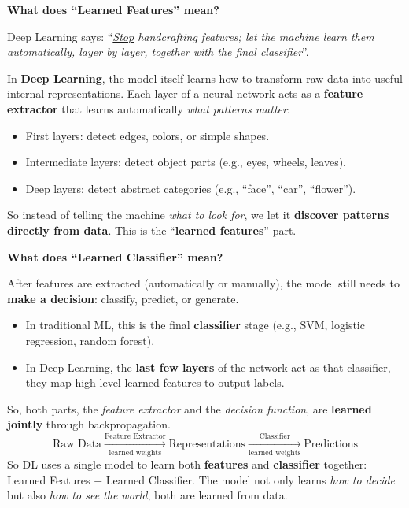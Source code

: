 \highspace
\begin{flushleft}
    \textcolor{Green3}{ \textbf{What does ``Learned Features'' mean?}}
\end{flushleft}
Deep Learning says: ``\emph{\underline{Stop} handcrafting features; let the machine learn them automatically, layer by layer, together with the final classifier}''.

\highspace
In \textbf{Deep Learning}, the model itself learns how to transform raw data into useful internal representations. Each layer of a neural network acts as a \textbf{feature extractor} that learns automatically \emph{what patterns matter}:
\begin{itemize}
    \item First layers: detect edges, colors, or simple shapes.
    \item Intermediate layers: detect object parts (e.g., eyes, wheels, leaves).
    \item Deep layers: detect abstract categories (e.g., ``face'', ``car'', ``flower'').
\end{itemize}
So instead of telling the machine \emph{what to look for}, we let it \textbf{discover patterns directly from data}. This is the ``\textbf{learned features}'' part.

\highspace
\begin{flushleft}
    \textcolor{Green3}{ \textbf{What does ``Learned Classifier'' mean?}}
\end{flushleft}
After features are extracted (automatically or manually), the model still needs to \textbf{make a decision}: classify, predict, or generate.
\begin{itemize}
    \item In traditional ML, this is the final \textbf{classifier} stage (e.g., SVM, logistic regression, random forest).
    \item In Deep Learning, the \textbf{last few layers} of the network act as that classifier, they map high-level learned features to output labels.
\end{itemize}
So, both parts, the \emph{feature extractor} and the \emph{decision function}, are \textbf{learned jointly} through backpropagation.
\begin{equation*}
    \text{Raw Data} \xrightarrow[\text{learned weights}]{\text{Feature Extractor}} \text{Representations} \xrightarrow[\text{learned weights}]{\text{Classifier}} \text{Predictions}
\end{equation*}
So DL uses a single model to learn both \textbf{features} and \textbf{classifier} together: Learned Features $+$ Learned Classifier. The model not only learns \emph{how to decide} but also \emph{how to see the world}, both are learned from data.

